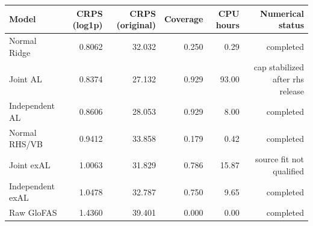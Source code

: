 \begin{tabular}{lrrrrr}
\toprule
Model & CRPS (log1p) & CRPS (original) & Coverage & CPU hours & Numerical status \\
\midrule
Normal Ridge & 0.8062 & 32.032 & 0.250 & 0.29 & completed \\
Joint AL & 0.8374 & 27.132 & 0.929 & 93.00 & cap stabilized after rhs release \\
Independent AL & 0.8606 & 28.053 & 0.929 & 8.00 & completed \\
Normal RHS/VB & 0.9412 & 33.858 & 0.179 & 0.42 & completed \\
Joint exAL & 1.0063 & 31.829 & 0.786 & 15.87 & source fit not qualified \\
Independent exAL & 1.0478 & 32.787 & 0.750 & 9.65 & completed \\
Raw GloFAS & 1.4360 & 39.401 & 0.000 & 0.00 & completed \\
\bottomrule
\end{tabular}
